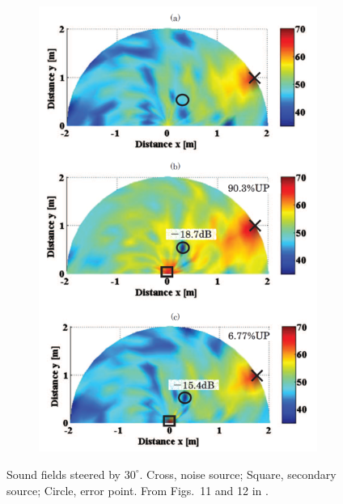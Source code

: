 \begin{figure}[!htb]
\begin{subfigure}{0.4\textwidth}
        \includegraphics[width = \textwidth]{fig/tanaka2010jasa_fig12_resize.png}
    \end{subfigure}
    \caption{Sound fields steered by \ensuremath{30^\circ}.  
    Cross, noise source; Square, secondary source; Circle, error point. 
From Figs.~11 and 12 in \cite{Tanaka2010ActiveNoiseControl}.}
    \label{fig:tanaka2010jasa_steer30}
\end{figure}

